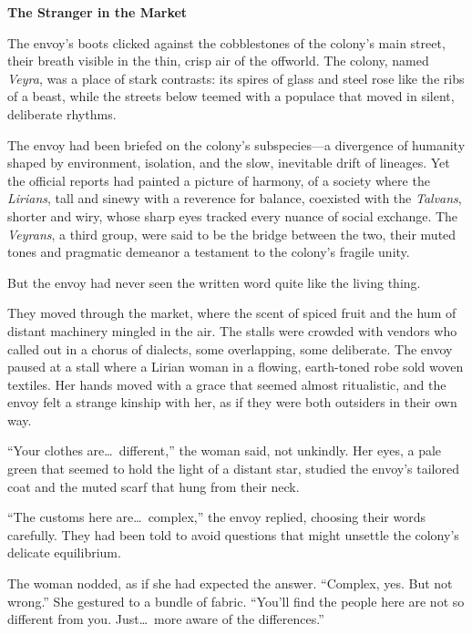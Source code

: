\documentclass{article}
\theoremstyle{plain}
\theoremstyle{definition}
\theoremstyle{remark}
\begin{document}
\vspace{0.5em}

\noindent
\begin{tcolorbox}[colback=red!3, colframe=red!40!black, title=\textbf{Qwen3-4B (Base)}, fonttitle=\bfseries, left=2mm, right=2mm, breakable]
\small
\textbf{The Stranger in the Market}

The envoy’s boots clicked against the cobblestones of the colony’s main street, their breath visible in the thin, crisp air of the offworld. The colony, named \textit{Veyra}, was a place of stark contrasts: its spires of glass and steel rose like the ribs of a beast, while the streets below teemed with a populace that moved in silent, deliberate rhythms. 

The envoy had been briefed on the colony’s subspecies---a divergence of humanity shaped by environment, isolation, and the slow, inevitable drift of lineages. Yet the official reports had painted a picture of harmony, of a society where the \textit{Lirians}, tall and sinewy with a reverence for balance, coexisted with the \textit{Talvans}, shorter and wiry, whose sharp eyes tracked every nuance of social exchange. The \textit{Veyrans}, a third group, were said to be the bridge between the two, their muted tones and pragmatic demeanor a testament to the colony’s fragile unity.  

But the envoy had never seen the written word quite like the living thing.  

They moved through the market, where the scent of spiced fruit and the hum of distant machinery mingled in the air. The stalls were crowded with vendors who called out in a chorus of dialects, some overlapping, some deliberate. The envoy paused at a stall where a Lirian woman in a flowing, earth-toned robe sold woven textiles. Her hands moved with a grace that seemed almost ritualistic, and the envoy felt a strange kinship with her, as if they were both outsiders in their own way.  

``Your clothes are\dots\ different,'' the woman said, not unkindly. Her eyes, a pale green that seemed to hold the light of a distant star, studied the envoy’s tailored coat and the muted scarf that hung from their neck.  

``The customs here are\dots\ complex,'' the envoy replied, choosing their words carefully. They had been told to avoid questions that might unsettle the colony’s delicate equilibrium.  

The woman nodded, as if she had expected the answer. ``Complex, yes. But not wrong.'' She gestured to a bundle of fabric. ``You’ll find the people here are not so different from you. Just\dots\ more aware of the differences.''  


\end{tcolorbox}
\end{document}

